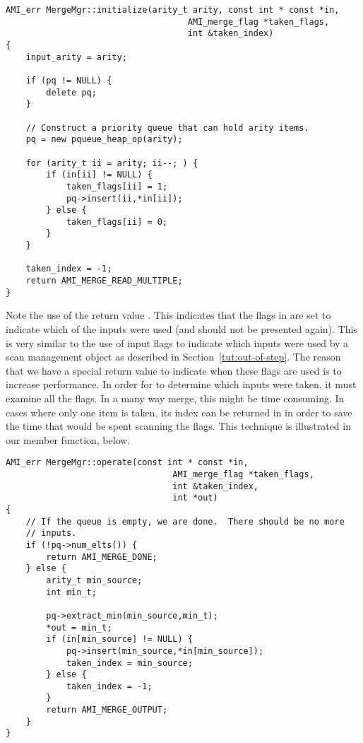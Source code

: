 \begin{verbatim}
AMI_err MergeMgr::initialize(arity_t arity, const int * const *in,
                                    AMI_merge_flag *taken_flags,
                                    int &taken_index)
{
    input_arity = arity;

    if (pq != NULL) {
        delete pq;
    }

    // Construct a priority queue that can hold arity items.
    pq = new pqueue_heap_op(arity);

    for (arity_t ii = arity; ii--; ) {
        if (in[ii] != NULL) {
            taken_flags[ii] = 1;
            pq->insert(ii,*in[ii]);
        } else {
            taken_flags[ii] = 0;
        }
    }

    taken_index = -1;
    return AMI_MERGE_READ_MULTIPLE;
}
\end{verbatim}

Note the use of the return value .  This
indicates that the flags in  are set to
indicate which of the inputs were used (and should not be presented
again).  This is very similar to the use of input flags to indicate
which inputs were used by a scan management object as described in
Section~\ref{tut:out-of-step}.  The reason that we have a special
return value to indicate when these flags are used is to increase
performance.  In order for  to determine which inputs
were taken, it must examine all the flags.  In a many way merge, this
might be time consuming.  In cases where only one item is taken, its
index can be returned in  in order to save the time
that would be spent scanning the flags.  This technique is illustrated in our
 member function, below.

\begin{verbatim}
AMI_err MergeMgr::operate(const int * const *in,
                                 AMI_merge_flag *taken_flags,
                                 int &taken_index,
                                 int *out)
{
    // If the queue is empty, we are done.  There should be no more
    // inputs.
    if (!pq->num_elts()) {
        return AMI_MERGE_DONE;
    } else {
        arity_t min_source;
        int min_t;

        pq->extract_min(min_source,min_t);
        *out = min_t;
        if (in[min_source] != NULL) {
            pq->insert(min_source,*in[min_source]);
            taken_index = min_source;
        } else {
            taken_index = -1;
        }
        return AMI_MERGE_OUTPUT;
    }
}
\end{verbatim}

